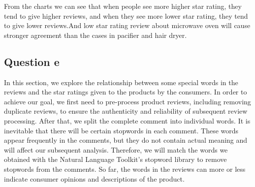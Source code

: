 \documentclass[12pt]{mcmthesis}
\begin{document}
\begin{figure}[htbp]
	\quad
\end{figure}
\newpage
From the charts we can see that when people see more higher star rating, they tend to give higher reviews, and when they see more lower star rating, they tend to give lower reviews.And low star rating review about microwave oven will cause stronger agreement than the cases in pacifier and hair dryer.
\subsection{Question e}
In this section, we explore the relationship between some special words in the reviews and the star ratings given to the products by the consumers. In order to achieve our goal, we first need to pre-process product reviews, including removing duplicate reviews, to ensure the authenticity and reliability of subsequent review processing. After that, we split the complete comment into individual words. It is inevitable that there will be certain stopwords in each comment. These words appear frequently in the comments, but they do not contain actual meaning and will affect our subsequent analysis. Therefore, we will match the words we obtained with the Natural Language Toolkit's stopword library to remove stopwords from the comments. So far, the words in the reviews can more or less indicate consumer opinions and descriptions of the product.
\end{document}
